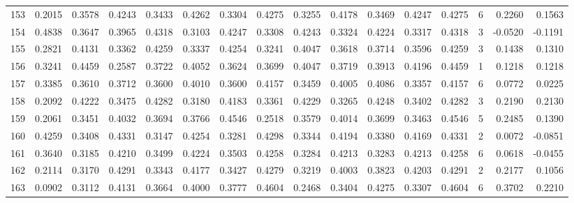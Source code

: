 \begin{tabular}{lrrrrrrrrrrrrrrr}
153 &      0.2015 &  0.3578 &  0.4243 &  0.3433 &  0.4262 &  0.3304 &  0.4275 &  0.3255 &  0.4178 &  0.3469 &   0.4247 &     0.4275 &      6 &                    0.2260 &                     0.1563 \\
154 &      0.4838 &  0.3647 &  0.3965 &  0.4318 &  0.3103 &  0.4247 &  0.3308 &  0.4243 &  0.3324 &  0.4224 &   0.3317 &     0.4318 &      3 &                   -0.0520 &                    -0.1191 \\
155 &      0.2821 &  0.4131 &  0.3362 &  0.4259 &  0.3337 &  0.4254 &  0.3241 &  0.4047 &  0.3618 &  0.3714 &   0.3596 &     0.4259 &      3 &                    0.1438 &                     0.1310 \\
156 &      0.3241 &  0.4459 &  0.2587 &  0.3722 &  0.4052 &  0.3624 &  0.3699 &  0.4047 &  0.3719 &  0.3913 &   0.4196 &     0.4459 &      1 &                    0.1218 &                     0.1218 \\
157 &      0.3385 &  0.3610 &  0.3712 &  0.3600 &  0.4010 &  0.3600 &  0.4157 &  0.3459 &  0.4005 &  0.4086 &   0.3357 &     0.4157 &      6 &                    0.0772 &                     0.0225 \\
158 &      0.2092 &  0.4222 &  0.3475 &  0.4282 &  0.3180 &  0.4183 &  0.3361 &  0.4229 &  0.3265 &  0.4248 &   0.3402 &     0.4282 &      3 &                    0.2190 &                     0.2130 \\
159 &      0.2061 &  0.3451 &  0.4032 &  0.3694 &  0.3766 &  0.4546 &  0.2518 &  0.3579 &  0.4014 &  0.3699 &   0.3463 &     0.4546 &      5 &                    0.2485 &                     0.1390 \\
160 &      0.4259 &  0.3408 &  0.4331 &  0.3147 &  0.4254 &  0.3281 &  0.4298 &  0.3344 &  0.4194 &  0.3380 &   0.4169 &     0.4331 &      2 &                    0.0072 &                    -0.0851 \\
161 &      0.3640 &  0.3185 &  0.4210 &  0.3499 &  0.4224 &  0.3503 &  0.4258 &  0.3284 &  0.4213 &  0.3283 &   0.4213 &     0.4258 &      6 &                    0.0618 &                    -0.0455 \\
162 &      0.2114 &  0.3170 &  0.4291 &  0.3343 &  0.4177 &  0.3427 &  0.4279 &  0.3219 &  0.4003 &  0.3823 &   0.4203 &     0.4291 &      2 &                    0.2177 &                     0.1056 \\
163 &      0.0902 &  0.3112 &  0.4131 &  0.3664 &  0.4000 &  0.3777 &  0.4604 &  0.2468 &  0.3404 &  0.4275 &   0.3307 &     0.4604 &      6 &                    0.3702 &                     0.2210 \\

\end{tabular}
